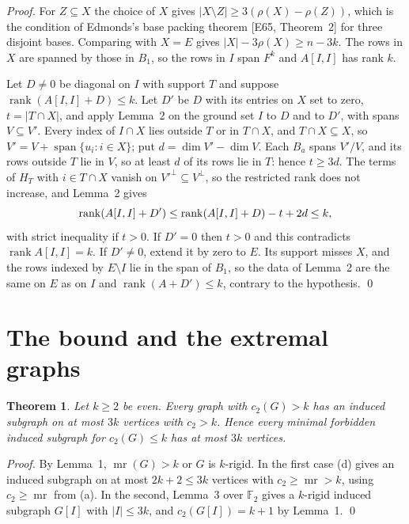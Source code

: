 \documentclass[11pt,letterpaper,reqno]{amsart}
\theoremstyle{spaced}
\newtheorem{theorem}{Theorem}
\begin{document}
\emph{Proof.} For \(Z \subseteq X\) the choice of \(X\) gives \(\lvert X \setminus Z\rvert \ge 3(\rho(X) - \rho(Z))\), which is the condition of Edmonds's base packing theorem {[}E65, Theorem~2{]} for three disjoint bases. Comparing with \(X = E\) gives \(\lvert X\rvert - 3\rho(X) \ge n - 3k\). The rows in \(X\) are spanned by those in \(B_1\), so the rows in \(I\) span \(F^k\) and \(A[I, I]\) has rank \(k\).

\begingroup{} Let \(D \ne 0\) be diagonal on \(I\) with support \(T\) and suppose \(\operatorname{rank}(A[I, I] + D) \le k\). Let \(D'\) be \(D\) with its entries on \(X\) set to zero, \(t = \lvert T \cap X\rvert\), and apply Lemma~2 on the ground set \(I\) to \(D\) and to \(D'\), with spans \(V \subseteq V'\). Every index of \(I \cap X\) lies outside \(T\) or in \(T \cap X\), and \(T \cap X \subseteq X\), so \(V' = V + \operatorname{span}\{u_i : i \in X\}\); put \(d = \dim V' - \dim V\). Each \(B_a\) spans \(V'/V\), and its rows outside \(T\) lie in \(V\), so at least \(d\) of its rows lie in \(T\): hence \(t \ge 3d\). The terms of \(H_T\) with \(i \in T \cap X\) vanish on \(V'^{\perp} \subseteq V^{\perp}\), so the restricted rank does not increase, and Lemma~2 gives
\[\operatorname{rank}(A[I, I] + D') \le \operatorname{rank}(A[I, I] + D) - t + 2d \le k,\postdisplaypenalty=10000 \]
with strict inequality if \(t > 0\). If \(D' = 0\) then \(t > 0\) and this contradicts \(\operatorname{rank} A[I, I] = k\). If \(D' \ne 0\), extend it by zero to \(E\). Its support misses \(X\), and the rows indexed by \(E \setminus I\) lie in the span of \(B_1\), so the data of Lemma~2 are the same on \(E\) as on \(I\) and \(\operatorname{rank}(A + D') \le k\), contrary to the hypothesis. \qed\par\endgroup

\hypertarget{the-bound-and-the-extremal-graphs}{%
\section{The bound and the extremal graphs}\label{the-bound-and-the-extremal-graphs}}

\begin{theorem}
Let \(k \ge 2\) be even. Every graph with \(c_2(G) > k\) has an induced subgraph on at most \(3k\) vertices with \(c_2 > k\). Hence every minimal forbidden induced subgraph for \(c_2(G) \le k\) has at most \(3k\) vertices.
\end{theorem}

\emph{Proof.} By Lemma~1, \(\operatorname{mr}(G) > k\) or \(G\) is \(k\)-rigid. In the first case (d) gives an induced subgraph on at most \(2k+2 \le 3k\) vertices with \(c_2 \ge \operatorname{mr} > k\), using \(c_2 \ge \operatorname{mr}\) from (a). In the second, Lemma~3 over \(\mathbb{F}_2\) gives a \(k\)-rigid induced subgraph \(G[I]\) with \(\lvert I\rvert \le 3k\), and \(c_2(G[I]) = k+1\) by Lemma~1. \qed
\end{document}

